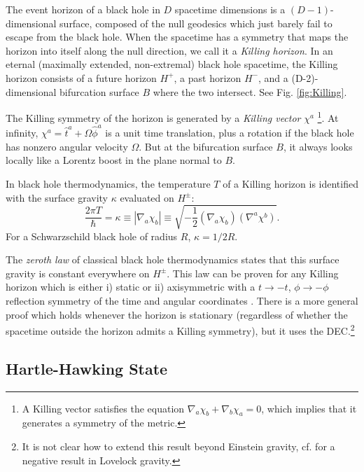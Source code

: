 \documentclass[12pt]{article}
\def\be{\begin{equation}}
\def\ee{\end{equation}}
\begin{document}
The event horizon of a black hole in $D$ spacetime dimensions is a $(D-1)$-dimensional surface, composed of the null geodesics which just barely fail to escape from the black hole.  When the spacetime has a symmetry that maps the horizon into itself along the null direction, we call it a \emph{Killing horizon}.  In an eternal (maximally extended, non-extremal) black hole spacetime, the Killing horizon consists of a future horizon $H^+$, a past horizon $H^-$, and a (D-2)-dimensional bifurcation surface $B$ where the two intersect.  See Fig. \ref{fig:Killing}.

The Killing symmetry of the horizon is generated by a \emph{Killing vector} $\chi^a$ \footnote{A Killing vector satisfies the equation $\nabla_a \chi_b + \nabla_b \chi_a = 0$, which implies that it generates a symmetry of the metric.}.  At infinity, $\chi^a = \hat{t}^a + \Omega \hat{\phi}^a$ is a unit time translation, plus a rotation if the black hole has nonzero angular velocity $\Omega$.  But at the bifurcation surface $B$, it always looks locally like a Lorentz boost in the plane normal to $B$.  
 

In black hole thermodynamics, the temperature $T$ of a Killing horizon is identified with the surface gravity $\kappa$ evaluated on $H^{\pm}$:
\be
\frac{2\pi T}{\hbar} = \kappa \equiv \left\lvert \nabla_a \chi_b \right\rvert \equiv \sqrt{-\frac{1}{2} (\nabla_a \chi_b)(\nabla^a \chi^b)}.
\ee
For a Schwarzschild black hole of radius $R$, $\kappa = 1/2R$.

The \emph{zeroth law} of classical black hole thermodynamics states that this surface gravity is constant everywhere on $H^\pm$.  This law can be proven for any Killing horizon which is either i) static or ii) axisymmetric with a $t \to -t$, $\phi \to -\phi$ reflection symmetry of the time and angular coordinates \cite{carter1971axisymmetric,racz1996global}.  There is a more general proof which holds whenever the horizon is stationary (regardless of whether the spacetime outside the horizon admits a Killing symmetry), but it uses the DEC.\footnote{It is not clear how to extend this result beyond Einstein gravity, cf. \cite{sarkar2013issue} for a negative result in Lovelock gravity.}

\subsection{Hartle-Hawking State}\label{sec:HH}
\end{document}
